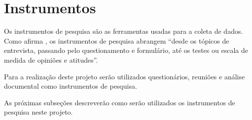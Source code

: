 \section{Instrumentos}

\par Os instrumentos de pesquisa são as ferramentas usadas para a coleta de dados. Como afirma , os instrumentos de pesquisa abrangem “desde os tópicos de entrevista, passando pelo questionamento e formulário, até os testes ou escala de medida de opiniões e atitudes”.

\par Para a realização deste projeto serão utilizados questionários, reuniões e análise documental como instrumentos de pesquisa. 

\par As próximas subseções descreverão como serão utilizados os instrumentos de pesquisa neste projeto.
